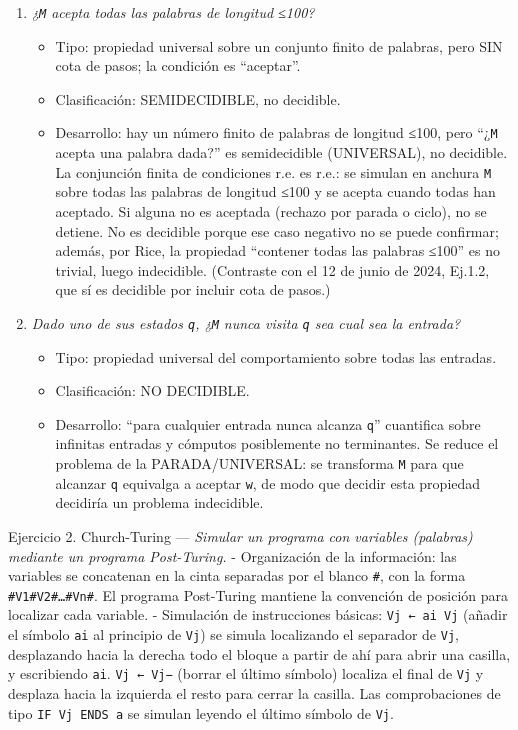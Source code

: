 \documentclass[12pt]{book} %
\providecommand{\tightlist}{%
  \setlength{\itemsep}{0pt}\setlength{\parskip}{0pt}}
\begin{document}
\begin{enumerate}
\def\labelenumi{\arabic{enumi}.}
\tightlist
\item
  \emph{¿\texttt{M} acepta todas las palabras de longitud ≤100?}

  \begin{itemize}
  \tightlist
  \item
    Tipo: propiedad universal sobre un conjunto finito de palabras, pero
    SIN cota de pasos; la condición es ``aceptar''.
  \item
    Clasificación: SEMIDECIDIBLE, no decidible.
  \item
    Desarrollo: hay un número finito de palabras de longitud ≤100, pero
    ``¿\texttt{M} acepta una palabra dada?'' es semidecidible
    (UNIVERSAL), no decidible. La conjunción finita de condiciones r.e.
    es r.e.: se simulan en anchura \texttt{M} sobre todas las palabras
    de longitud ≤100 y se acepta cuando todas han aceptado. Si alguna no
    es aceptada (rechazo por parada o ciclo), no se detiene. No es
    decidible porque ese caso negativo no se puede confirmar; además,
    por Rice, la propiedad ``contener todas las palabras ≤100'' es no
    trivial, luego indecidible. (Contraste con el 12 de junio de 2024,
    Ej.1.2, que sí es decidible por incluir cota de pasos.)
  \end{itemize}
\item
  \emph{Dado uno de sus estados \texttt{q}, ¿\texttt{M} nunca visita
  \texttt{q} sea cual sea la entrada?}

  \begin{itemize}
  \tightlist
  \item
    Tipo: propiedad universal del comportamiento sobre todas las
    entradas.
  \item
    Clasificación: NO DECIDIBLE.
  \item
    Desarrollo: ``para cualquier entrada nunca alcanza \texttt{q}''
    cuantifica sobre infinitas entradas y cómputos posiblemente no
    terminantes. Se reduce el problema de la PARADA/UNIVERSAL: se
    transforma \texttt{M} para que alcanzar \texttt{q} equivalga a
    aceptar \texttt{w}, de modo que decidir esta propiedad decidiría un
    problema indecidible.
  \end{itemize}
\end{enumerate}

Ejercicio 2. Church-Turing --- \emph{Simular un programa con variables
(palabras) mediante un programa Post-Turing.} - Organización de la
información: las variables se concatenan en la cinta separadas por el
blanco \texttt{\#}, con la forma \texttt{\#V1\#V2\#…\#Vn\#}. El programa
Post-Turing mantiene la convención de posición para localizar cada
variable. - Simulación de instrucciones básicas: \texttt{Vj\ ←\ ai\ Vj}
(añadir el símbolo \texttt{ai} al principio de \texttt{Vj}) se simula
localizando el separador de \texttt{Vj}, desplazando hacia la derecha
todo el bloque a partir de ahí para abrir una casilla, y escribiendo
\texttt{ai}. \texttt{Vj\ ←\ Vj−} (borrar el último símbolo) localiza el
final de \texttt{Vj} y desplaza hacia la izquierda el resto para cerrar
la casilla. Las comprobaciones de tipo \texttt{IF\ Vj\ ENDS\ a} se
simulan leyendo el último símbolo de \texttt{Vj}.
\end{document}

